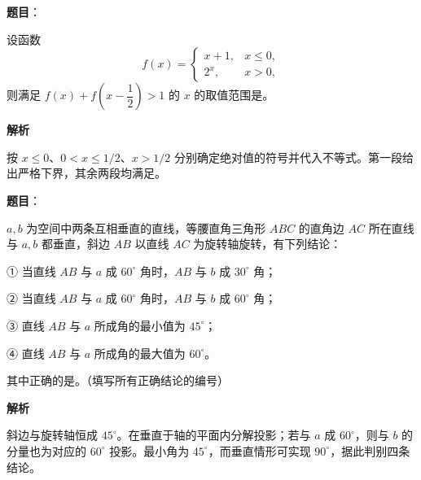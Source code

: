 \begin{answer}

\textbf{题目}：

设函数
\nopagebreak[4]
\[
f(x)=\begin{cases}
x+1,&x\le 0,\\
2^x,&x>0,
\end{cases}
\]
则满足 \(f(x)+f\left(x-\dfrac12\right)>1\) 的 \(x\) 的取值范围是\gkblank{}。

\textbf{解析}

按 \(x\le0\)、\(0<x\le1/2\)、\(x>1/2\) 分别确定绝对值的符号并代入不等式。第一段给出严格下界，其余两段均满足。


\end{answer}
\begin{answer}

\textbf{题目}：

\(a,b\) 为空间中两条互相垂直的直线，等腰直角三角形 \(ABC\) 的直角边 \(AC\) 所在直线与 \(a,b\) 都垂直，斜边 \(AB\) 以直线 \(AC\) 为旋转轴旋转，有下列结论：

   ① 当直线 \(AB\) 与 \(a\) 成 \(60^\circ\) 角时，\(AB\) 与 \(b\) 成 \(30^\circ\) 角；

   ② 当直线 \(AB\) 与 \(a\) 成 \(60^\circ\) 角时，\(AB\) 与 \(b\) 成 \(60^\circ\) 角；

   ③ 直线 \(AB\) 与 \(a\) 所成角的最小值为 \(45^\circ\)；

   ④ 直线 \(AB\) 与 \(a\) 所成角的最大值为 \(60^\circ\)。

   其中正确的是\gkblank{}。（填写所有正确结论的编号）

\textbf{解析}

斜边与旋转轴恒成 \(45^\circ\)。在垂直于轴的平面内分解投影；若与 \(a\) 成 \(60^\circ\)，则与 \(b\) 的分量也为对应的 \(60^\circ\) 投影。最小角为 \(45^\circ\)，而垂直情形可实现 \(90^\circ\)，据此判别四条结论。


\end{answer}
